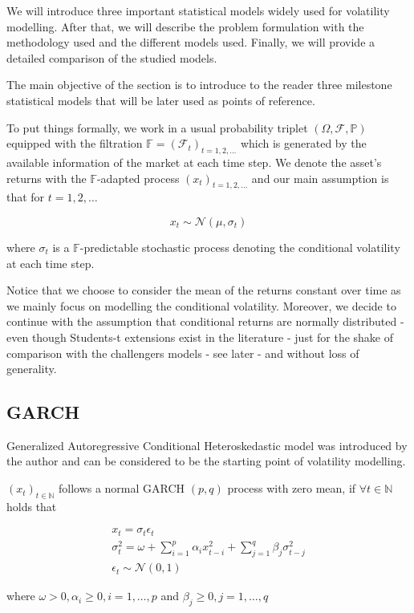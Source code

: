 \documentclass[a4paper, oneside]{discothesis}
\begin{document}
We will introduce three important statistical models widely used for volatility modelling. After that, we will describe the problem formulation with the methodology used and the different models used. Finally, we will provide a detailed comparison of the studied models.


The main objective of the section is to introduce to the reader three milestone statistical models that will be later used as points of reference. 

To put things formally, we work in a usual probability triplet $\left( \Omega, \mathcal{F}, \mathbb{P}\right)$ equipped with the filtration $\mathbb{F} = \left(\mathcal{F}_t\right)_{t = 1, 2, \dots}$ which is generated by the available information of the market at each time step. We denote the asset's returns with the $\mathbb{F}$-adapted process  $\left(x_t\right)_{t = 1, 2, \dots}$ and our main assumption is that for $t = 1,2,\dots$ 

\begin{equation}\label{eq:1d-ass}
x_t \sim \mathcal{N}\left(\mu, \sigma_t\right)
\end{equation}

where $\sigma_t$ is a $\mathbb{F}$-predictable stochastic process denoting the conditional volatility at each time step.

Notice that we choose to consider the mean of the returns constant over time as we mainly focus on modelling the conditional volatility. 
Moreover, we decide to continue with the assumption that conditional returns are normally distributed - even though Students-t extensions exist in the literature - just for the shake of comparison with the challengers models - see later -  and without loss of generality.

\subsection{GARCH}

Generalized Autoregressive Conditional Heteroskedastic model was introduced by the author \cite{garch} and can be considered to be the starting point of volatility modelling.

\begin{definition}\label{thm:garch_def}

$\left(x_t\right)_{t\in \mathbb{N}}$ follows a normal GARCH $\left(p, q\right)$ process with zero mean, if $\forall t \in \mathbb{N}$ holds that

\begin{gather*}\label{eq:1}
x_t = \sigma_t \epsilon_t \\
\sigma^2_t = \omega + \sum_{i=1}^p\alpha_i x_{t-i}^2 + \sum_{j=1}^q \beta_j 
\sigma_{t-j}^2  \\
\epsilon_t \sim \mathcal{N}\left(0,1\right)
\end{gather*}

\end{definition}
where $\omega > 0, \alpha_i \geq 0, i = 1,\dots,p$ and $\beta_j \geq 0, j = 1,\dots,q$
\end{document}

